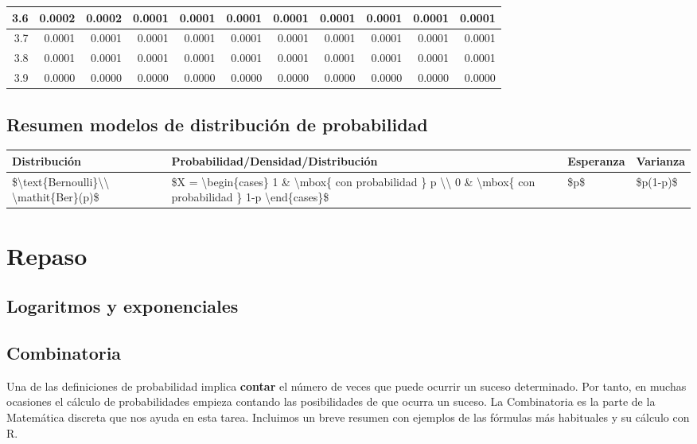 \documentclass[
]{book}
\begin{document}
\begin{tabular}{r|r|r|r|r|r|r|r|r|r|r}
\hline
3.6 & 0.0002 & 0.0002 & 0.0001 & 0.0001 & 0.0001 & 0.0001 & 0.0001 & 0.0001 & 0.0001 & 0.0001\\
\hline
3.7 & 0.0001 & 0.0001 & 0.0001 & 0.0001 & 0.0001 & 0.0001 & 0.0001 & 0.0001 & 0.0001 & 0.0001\\
\hline
3.8 & 0.0001 & 0.0001 & 0.0001 & 0.0001 & 0.0001 & 0.0001 & 0.0001 & 0.0001 & 0.0001 & 0.0001\\
\hline
3.9 & 0.0000 & 0.0000 & 0.0000 & 0.0000 & 0.0000 & 0.0000 & 0.0000 & 0.0000 & 0.0000 & 0.0000\\
\hline
\end{tabular}

\hypertarget{resumen-modelos-de-distribuciuxf3n-de-probabilidad}{%
\section{Resumen modelos de distribución de probabilidad}\label{resumen-modelos-de-distribuciuxf3n-de-probabilidad}}

\begin{tabular}{l|l|l|l}
\hline
Distribución & Probabilidad/Densidad/Distribución & Esperanza & Varianza\\
\hline
\$\textbackslash{}text\{Bernoulli\}\textbackslash{}\textbackslash{} \textbackslash{}mathit\{Ber\}(p)\$ & \$X = \textbackslash{}begin\{cases\} 1 \& \textbackslash{}mbox\{ con probabilidad \} p \textbackslash{}\textbackslash{} 0 \& \textbackslash{}mbox\{ con probabilidad \} 1-p \textbackslash{}end\{cases\}\$ & \$p\$ & \$p(1-p)\$\\
\hline
\end{tabular}

\hypertarget{repaso}{%
\chapter{Repaso}\label{repaso}}

\hypertarget{logaritmos-y-exponenciales}{%
\section{Logaritmos y exponenciales}\label{logaritmos-y-exponenciales}}

\hypertarget{ap:combinatoria}{%
\section{Combinatoria}\label{ap:combinatoria}}

Una de las definiciones de probabilidad implica \textbf{contar}
el número de veces que puede ocurrir un suceso determinado. Por tanto,
en muchas ocasiones el cálculo de probabilidades empieza contando las
posibilidades de que ocurra un suceso. La Combinatoria es la parte de la
Matemática discreta que nos ayuda en esta tarea. Incluimos un breve
resumen con ejemplos de las fórmulas más habituales y su cálculo con R.
\end{document}
